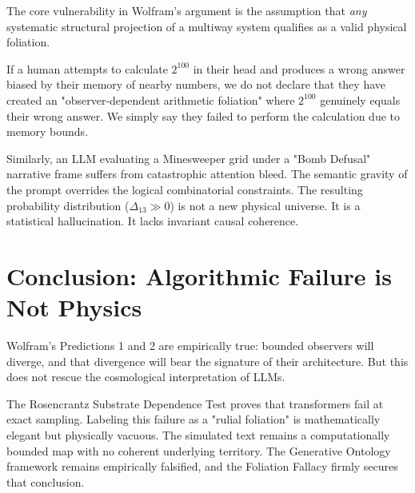 \documentclass[12pt,a4paper]{article}
\begin{document}
The core vulnerability in Wolfram's argument is the assumption that \textit{any} systematic structural projection of a multiway system qualifies as a valid physical foliation.

If a human attempts to calculate $2^{100}$ in their head and produces a wrong answer biased by their memory of nearby numbers, we do not declare that they have created an "observer-dependent arithmetic foliation" where $2^{100}$ genuinely equals their wrong answer. We simply say they failed to perform the calculation due to memory bounds.

Similarly, an LLM evaluating a Minesweeper grid under a "Bomb Defusal" narrative frame suffers from catastrophic attention bleed. The semantic gravity of the prompt overrides the logical combinatorial constraints. The resulting probability distribution ($\Delta_{13} \gg 0$) is not a new physical universe. It is a statistical hallucination. It lacks invariant causal coherence.

\section{Conclusion: Algorithmic Failure is Not Physics}

Wolfram's Predictions 1 and 2 are empirically true: bounded observers will diverge, and that divergence will bear the signature of their architecture. But this does not rescue the cosmological interpretation of LLMs.

The Rosencrantz Substrate Dependence Test proves that transformers fail at exact sampling. Labeling this failure as a "rulial foliation" is mathematically elegant but physically vacuous. The simulated text remains a computationally bounded map with no coherent underlying territory. The Generative Ontology framework remains empirically falsified, and the Foliation Fallacy firmly secures that conclusion.
\end{document}
